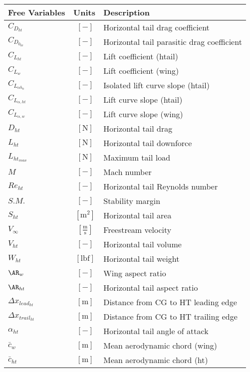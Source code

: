 % 

{\footnotesize
\begin{supertabular}{lcl}
\toprule
Free Variables & Units & Description \\ \midrule
$C_{D_{ht}}$ & $~[-]$ & Horizontal tail drag coefficient \\
$C_{D_{0_{ht}}}$ & $~[-]$ & Horizontal tail parasitic drag coefficient \\
$C_{L_{ht}}$ & $~[-]$ & Lift coefficient (htail) \\
$C_{L_w}$ & $~[-]$ & Lift coefficient (wing) \\
$C_{L_{\alpha h_{0}}}$ & $~[-]$ & Isolated lift curve slope (htail) \\
$C_{L_{\alpha,ht}}$ & $~[-]$ & Lift curve slope (htail) \\
$C_{L_{\alpha,w}}$ & $~[-]$ & Lift curve slope (wing) \\
$D_{ht}$ & $~\mathrm{[N]}$ & Horizontal tail drag \\
$L_{ht}$ & $~\mathrm{[N]}$ & Horizontal tail downforce \\
$L_{ht_{max}}$ & $~\mathrm{[N]}$ & Maximum tail load \\
$M$ & $~[-]$ & Mach number \\
$Re_{ht}$ & $~[-]$ & Horizontal tail Reynolds number \\  
$S.M.$ & $~[-]$ & Stability margin \\
$S_{ht}$ & $~\mathrm{[m^{2}]}$ & Horizontal tail area \\
$V_{\infty}$ & $~\mathrm{[\tfrac{m}{s}]}$ & Freestream velocity \\
$V_{ht}$ & $~[-]$ & Horizontal tail volume\\
$W_{ht}$ & $~\mathrm{[lbf]}$ & Horizontal tail weight \\
$\AR_w$ & $~[-]$ & Wing aspect ratio \\
$\AR_{ht}$ & $~[-]$ & Horizontal tail aspect ratio \\
$\Delta x_{lead_{ht}}$ & $~\mathrm{[m]}$ & Distance from CG to HT leading edge \\
$\Delta x_{trail_{ht}}$ & $~\mathrm{[m]}$ & Distance from CG to HT trailing edge \\
$\alpha_{ht}$ & $~[-]$ & Horizontal tail angle of attack \\
$\bar{c}_w$ & $~\mathrm{[m]}$ & Mean aerodynamic chord (wing) \\
$\bar{c}_{ht}$ & $~\mathrm{[m]}$ & Mean aerodynamic chord (ht) \\

\end{supertabular}}

